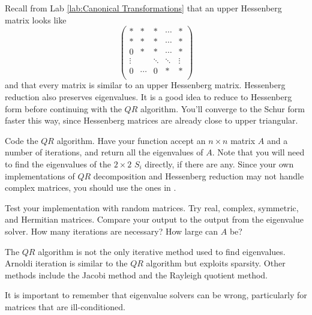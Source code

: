 Recall from Lab \ref{lab:Canonical Transformations} that an upper Hessenberg matrix looks like
\[
\begin{pmatrix}
*           & * & \ast & \cdots   & *\\
*           & * & * & \cdots   & * \\
0          & * & * &  \cdots&* \\
\vdots &  & \ddots    & \ddots & \vdots \\
0 & \cdots & 0 & * & *\\
\end{pmatrix} 
\]
and that every matrix is similar to an upper Hessenberg matrix.
Hessenberg reduction also preserves eigenvalues.
It is a good idea to reduce to Hessenberg form before continuing with the $QR$ algorithm.
You'll converge to the Schur form faster this way, since Hessenberg matrices are already close to upper triangular.

\begin{problem}
Code the $QR$ algorithm.
Have your function accept an $n \times n$ matrix $A$ and a number of iterations, and return all the eigenvalues of $A$.
Note that you will need to find the eigenvalues of the $2 \times 2$ $S_i$ directly, if there are any.
Since your own implementations of $QR$ decomposition and Hessenberg reduction may not handle complex matrices, you should use the ones in .
\end{problem}

\begin{comment}

\begin{problem}
If $A$ is normal, its Schur form is diagonal.
For normal $A$, have your function additionally output the eigenvector corresponding to each eigenvalue.
Hint 1: Test your function on Hermitian and real symmetric matrices; they are both normal.
Hint 2: Your work in Problem \ref{problem:similarity proof} will help.
You have already made all the necessary calculations, you just need to store the information correctly.
\end{problem}

\end{comment}

\begin{problem}
Test your implementation with random matrices.
Try real, complex, symmetric, and Hermitian matrices.
Compare your output to the output from the eigenvalue solver.
How many iterations are necessary?
How large can $A$ be?
\end{problem}

The $QR$ algorithm is not the only iterative method used to find eigenvalues.
Arnoldi iteration is similar to the $QR$ algorithm but exploits sparsity.
Other methods include the Jacobi method and the Rayleigh quotient method.

It is important to remember that eigenvalue solvers can be wrong, particularly for matrices that are ill-conditioned.